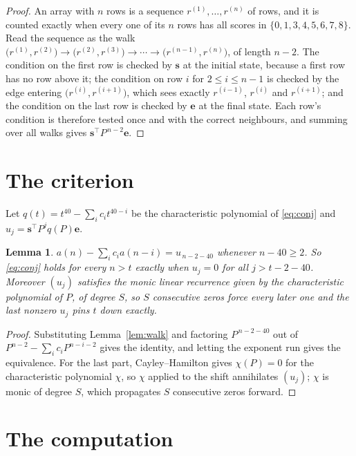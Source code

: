 \documentclass[11pt,a4paper]{article}
\theoremstyle{plain}
\newtheorem{lemma}[theorem]{Lemma}
\theoremstyle{definition}
\begin{document}
\begin{proof}
An array with $n$ rows is a sequence $r^{(1)},\dots,r^{(n)}$ of rows, and it is counted
exactly when every one of its $n$ rows has all scores in $\{0,1,3,4,5,6,7,8\}$. Read the sequence as the
walk $\bigl(r^{(1)},r^{(2)}\bigr)\to\bigl(r^{(2)},r^{(3)}\bigr)\to\cdots\to
\bigl(r^{(n-1)},r^{(n)}\bigr)$, of length $n-2$. The condition on the first row is
checked by $\mathbf{s}$ at the initial state, because a first row has no row above it; the
condition on row $i$ for $2\le i\le n-1$ is checked by the edge entering
$\bigl(r^{(i)},r^{(i+1)}\bigr)$, which sees exactly $r^{(i-1)}$, $r^{(i)}$ and
$r^{(i+1)}$; and the condition on the last row is checked by $\mathbf{e}$ at the final
state. Each row's condition is therefore tested once and with the correct neighbours, and
summing over all walks gives $\mathbf{s}^{\!\top}P^{\,n-2}\mathbf{e}$.
\end{proof}

\section{The criterion}

Let $q(t)=t^{40}-\sum_i c_i t^{40-i}$ be the characteristic polynomial of
\eqref{eq:conj} and $u_j=\mathbf{s}^{\!\top}P^{j}q(P)\mathbf{e}$.

\begin{lemma}\label{lem:crit}
$a(n)-\sum_i c_i a(n-i)=u_{\,n-2-40}$ whenever $n-40\ge2$. So \eqref{eq:conj}
holds for every $n>t$ exactly when $u_j=0$ for all $j>t-2-40$. Moreover $(u_j)$
satisfies the monic linear recurrence given by the characteristic polynomial of $P$, of
degree $S$, so $S$ consecutive zeros force every later one and the last nonzero $u_j$ pins
$t$ down exactly.
\end{lemma}

\begin{proof}
Substituting Lemma~\ref{lem:walk} and factoring $P^{\,n-2-40}$ out of
$P^{n-2}-\sum_i c_i P^{n-i-2}$ gives the identity, and letting the exponent run gives the
equivalence. For the last part, Cayley--Hamilton gives $\chi(P)=0$ for the characteristic
polynomial $\chi$, so $\chi$ applied to the shift annihilates $(u_j)$; $\chi$ is monic of
degree $S$, which propagates $S$ consecutive zeros forward.
\end{proof}

\section{The computation}
\end{document}
